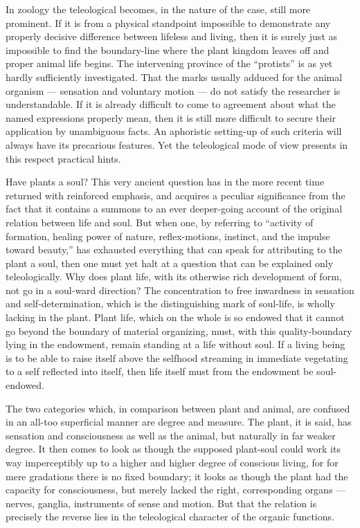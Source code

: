 \documentclass[12pt]{book}
\begin{document}
In zoology the teleological becomes, in the nature of the case, still more prominent. If
it is from a physical standpoint impossible to demonstrate any properly decisive
difference between lifeless and living, then it is surely just as impossible to find the
boundary-line where the plant kingdom leaves off and proper animal life begins. The
intervening province of the ``protists'' is as yet hardly sufficiently investigated. That
the marks usually adduced for the animal organism --- sensation and voluntary motion ---
do not satisfy the researcher is understandable. If it is already difficult to come to
agreement about what the named expressions properly mean, then it is still more difficult
to secure their application by unambiguous facts. An aphoristic setting-up of such
criteria will always have its precarious features. Yet the teleological mode of view
presents in this respect practical hints.

Have plants a soul? This very ancient question has in the more recent time returned with
reinforced emphasis, and acquires a peculiar significance from the fact that it contains a
summons to an ever deeper-going account of the original relation between life and soul. But
when one, by referring to ``activity of formation, healing power of nature, reflex-motions,
instinct, and the impulse toward beauty,'' has exhausted everything that can speak for
attributing to the plant a soul, then one must yet halt at a question that can be explained
only teleologically. Why does plant life, with its otherwise rich development of form, not
go in a soul-ward direction? The concentration to free inwardness in sensation and
self-determination, which is the distinguishing mark of soul-life, is wholly lacking in the
plant. Plant life, which on the whole is so endowed that it cannot go beyond the boundary of
material organizing, must, with this quality-boundary lying in the endowment, remain
standing at a life without soul. If a living being is to be able to raise itself above the
selfhood streaming in immediate vegetating to a self reflected into itself, then life itself
must from the endowment be soul-endowed.

The two categories which, in comparison between plant and animal, are confused in an all-too
superficial manner are degree and measure. The plant, it is said, has sensation and
consciousness as well as the animal, but naturally in far weaker degree. It then comes to
look as though the supposed plant-soul could work its way imperceptibly up to a higher and
higher degree of conscious living, for for mere gradations there is no fixed boundary; it
looks as though the plant had the capacity for consciousness, but merely lacked the right,
corresponding organs --- nerves, ganglia, instruments of sense and motion. But that the
relation is precisely the reverse lies in the teleological character of the organic
functions.
\end{document}
